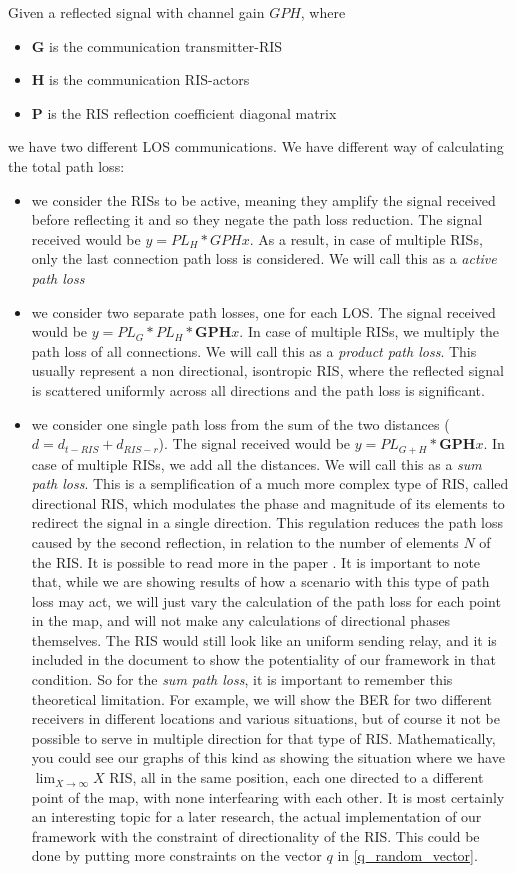 Given a reflected signal with channel gain $GPH$, where
\begin{itemize}
  \item $\bm{G}$ is the communication transmitter-RIS
  \item $\bm{H}$ is the communication RIS-actors
  \item $\bm{P}$ is the RIS reflection coefficient diagonal matrix
\end{itemize}
we have two different LOS communications. We have different way of calculating the total path loss:
\begin{itemize}
  \item we consider the RISs to be active, meaning they amplify the signal received before reflecting it and so they negate the path loss reduction. The signal received would be $y = PL_H * GPHx$. As a result, in case of multiple RISs, only the last connection path loss is considered. We will call this as a \textit{active path loss}
  \item we consider two separate path losses, one for each LOS. The signal received would be $y = PL_G * PL_H * \bm{GPH}x$. In case of multiple RISs, we multiply the path loss of all connections. We will call this as a \textit{product path loss}. This usually represent a non directional, isontropic RIS, where the reflected signal is scattered uniformly across all directions and the path loss is significant.
  \item we consider one single path loss from the sum of the two distances ($d = d_{t-RIS} + d_{RIS-r}$). The signal received would be $y = PL_{G+H} * \bm{GPH}x$. In case of multiple RISs, we add all the distances. We will call this as a \textit{sum path loss}. This is a semplification of a much more complex type of RIS, called directional RIS, which modulates the phase and magnitude of its elements to redirect the signal in a single direction. This regulation reduces the path loss caused by the second reflection, in relation to the number of elements $N$ of the RIS. It is possible to read more in the paper \cite{8888223}. It is important to note that, while we are showing results of how a scenario with this type of path loss may act, we will just vary the calculation of the path loss for each point in the map, and will not make any calculations of directional phases themselves. The RIS would still look like an uniform sending relay, and it is included in the document to show the potentiality of our framework in that condition. So for the \textit{sum path loss}, it is important to remember this theoretical limitation. For example, we will show the BER for two different receivers in different locations and various situations, but of course it not be possible to serve in multiple direction for that type of RIS. Mathematically, you could see our graphs of this kind as showing the situation where we have  $\lim_{X \to \infty} X$ RIS, all in the same position, each one directed to a different point of the map, with none interfearing with each other. It is most certainly an interesting topic for a later research, the actual implementation of our framework with the constraint of directionality of the RIS. This could be done by putting more constraints on the vector $q$ in \eqref{q_random_vector}.
\end{itemize}

